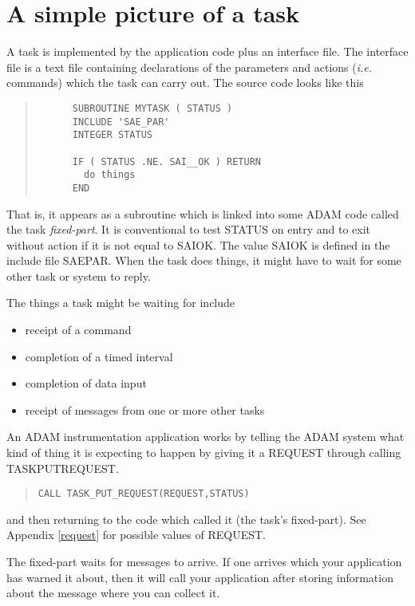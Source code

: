 \documentclass[twoside,11pt]{article}
\newcommand{\xlabel}[1]{}
\renewcommand{\_}{\texttt{\symbol{95}}}
\begin{document}
\section{A simple picture of a task\xlabel{a_simple_picture_of_a_task}}

A task is implemented by the application code plus an interface file.
The interface file is a text file containing declarations of the
parameters and actions ({\em i.e.} commands) which the task can carry out. The
source code looks like this
\small \begin{quote} \begin{verbatim}
      SUBROUTINE MYTASK ( STATUS )
      INCLUDE 'SAE_PAR'
      INTEGER STATUS

      IF ( STATUS .NE. SAI__OK ) RETURN
        do things
      END
\end{verbatim} \end{quote} \normalsize

That is, it appears as a subroutine which is linked into some ADAM code
called the task {\em fixed-part}.
It is conventional to test STATUS on entry and to exit without action if it
is not equal to SAI\_\_OK. The value SAI\_\_OK is defined in the include file
SAE\_PAR.
When the task does things, it might have to wait for some other task or
system to reply.

The things a task might be waiting for include
\begin{itemize}
\item receipt of a command
\item completion of a timed interval
\item completion of data input
\item receipt of messages from one or more other tasks
\end{itemize}
An ADAM instrumentation application works by telling the ADAM system
what kind of thing it is expecting to happen by giving it a REQUEST
through calling TASK\_PUT\_REQUEST.

\small \begin{quote} \begin{verbatim}
CALL TASK_PUT_REQUEST(REQUEST,STATUS)
\end{verbatim} \end{quote} \normalsize

and then returning to the code which called it (the task's fixed-part).
See Appendix \ref{request} for possible values of REQUEST.

The fixed-part waits for messages to arrive. If one arrives which your
application has warned it about, then it will call your application
after storing information about the message where you can collect it.
\end{document}
